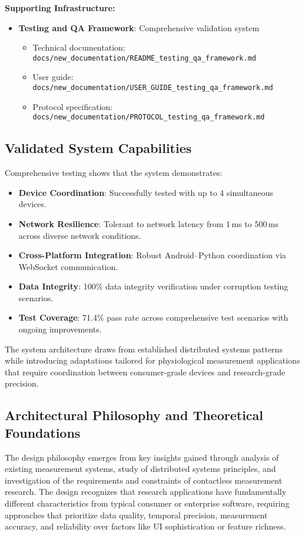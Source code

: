 \documentclass[11pt,a4paper]{report}
\begin{document}
\textbf{Supporting Infrastructure:}
\begin{itemize}
  \item \textbf{Testing and QA Framework}: Comprehensive validation system  
    \begin{itemize}
      \item Technical documentation: \texttt{docs/new\_documentation/README\_testing\_qa\_framework.md}
      \item User guide: \texttt{docs/new\_documentation/USER\_GUIDE\_testing\_qa\_framework.md}
      \item Protocol specification: \texttt{docs/new\_documentation/PROTOCOL\_testing\_qa\_framework.md}
    \end{itemize}
\end{itemize}

\subsection{Validated System Capabilities}

Comprehensive testing shows that the system demonstrates:
\begin{itemize}
  \item \textbf{Device Coordination}: Successfully tested with up to 4 simultaneous devices.
  \item \textbf{Network Resilience}: Tolerant to network latency from 1\,ms to 500\,ms across diverse network conditions.
  \item \textbf{Cross-Platform Integration}: Robust Android--Python coordination via WebSocket communication.
  \item \textbf{Data Integrity}: 100\% data integrity verification under corruption testing scenarios.
  \item \textbf{Test Coverage}: 71.4\% pass rate across comprehensive test scenarios with ongoing improvements.
\end{itemize}

The system architecture draws from established distributed systems patterns while introducing adaptations tailored for physiological measurement applications that require coordination between consumer-grade devices and research-grade precision.

\subsection{Architectural Philosophy and Theoretical Foundations}

The design philosophy emerges from key insights gained through analysis of existing measurement systems, study of distributed systems principles, and investigation of the requirements and constraints of contactless measurement research. The design recognizes that research applications have fundamentally different characteristics from typical consumer or enterprise software, requiring approaches that prioritize data quality, temporal precision, measurement accuracy, and reliability over factors like UI sophistication or feature richness.
\end{document}
